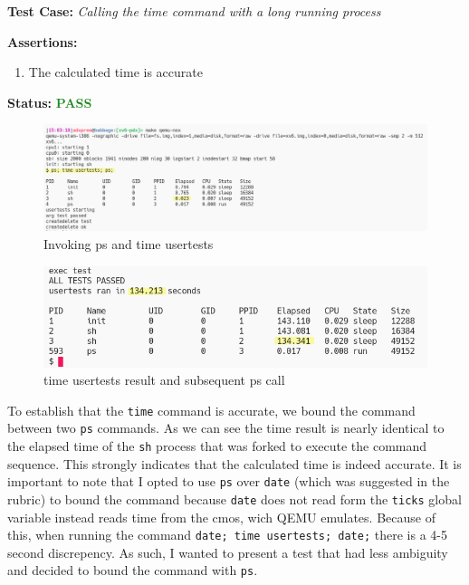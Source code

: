 \documentclass[11pt,letterpaper]{report}
\newcommand{\code}[1]{\colorbox{codegray}{\texttt{#1}}}
\begin{document}
{  \noindent\textbf{Test Case:} \emph{Calling the time command with a long running process}

  \noindent\textbf{Assertions:}
  \begin{enumerate}[]
  \item The calculated time is accurate
  \end{enumerate}  
  
  \noindent\textbf{Status:} \textcolor{ForestGreen}{\textbf{PASS}}
  
  \begin{figure}[h!]
	\centering
	\includegraphics[width=1\linewidth]{time-invocation.png}
	\caption[img]{Invoking ps and time usertests}
	\label{fig:P1compileP0-1}
  \end{figure}

  \begin{figure}[h!]
	\centering
	\includegraphics[width=1\linewidth]{time-result.png}
	\caption[img]{time usertests result and subsequent ps call}
	\label{fig:P1compileP0-1}
  \end{figure}

  \pagebreak

  To establish that the \code{time} command is accurate, we bound the command between
  two \code{ps} commands. As we can see the time result is nearly identical to the 
  elapsed time of the \code{sh} process that was forked to execute the command sequence.
  This strongly indicates that the calculated time is indeed accurate. It is important to note 
  that I opted to use \code{ps} over \code{date} (which was suggested in the rubric) to bound
  the command because \code{date} does not read form the \code{ticks} global variable instead reads time from 
  the cmos, wich QEMU emulates. Because of this, when running the command 
  \code{date; time usertests; date;} there is a 4-5 second discrepency. As such, I wanted
  to present a test that had less ambiguity and decided to bound the command with \code{ps}. 

\ifdefined \LF
} %
\fi
\end{document}
